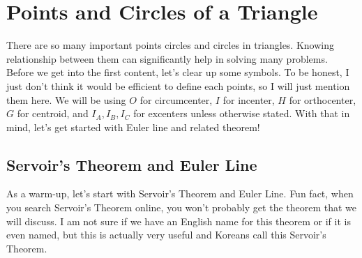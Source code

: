 \documentclass[../../../main.tex]{subfiles}
\begin{document}
\section{Points and Circles of a Triangle}

There are so many important points circles and circles in triangles.
Knowing relationship between them can significantly help in solving
many problems. Before we get into the first content, let's clear
up some symbols. To be honest, I just don't think it would be
efficient to define each points, so I will just mention them here.
We will be using $O$ for circumcenter, $I$ for incenter, $H$ for
orthocenter, $G$ for centroid, and $I_A, I_B, I_C$ for excenters
unless otherwise stated. With that in mind, let's get started with
Euler line and related theorem!

\subsection{Servoir's Theorem and Euler Line}

As a warm-up, let's start with Servoir's Theorem and Euler Line.
Fun fact, when you search Servoir's Theorem online, you won't
probably get the theorem that we will discuss. I am not sure if
we have an English name for this theorem or if it is even named,
but this is actually very useful and Koreans call this Servoir's
Theorem.
\end{document}
